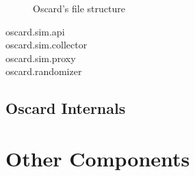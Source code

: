 \begin{figure}[!ht]
\label{fig:oscard_tree}
\caption{Oscard's file structure}
\end{figure}

\begin{description}
	\item[oscard.sim.api]
	\item[oscard.sim.collector]
	\item[oscard.sim.proxy]
	\item[oscard.randomizer]
\end{description}

\subsection{Oscard Internals}
\label{sub:oscard_internals}



\section{Other Components}
\label{sec:others}

